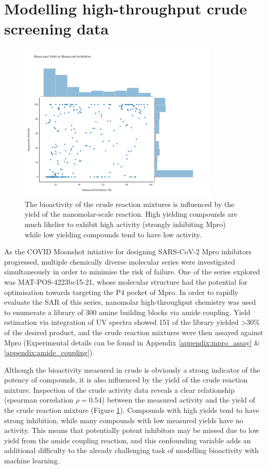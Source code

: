 \section{Modelling high-throughput crude screening data}

\begin{figure}[!t]
    \centering
    \includegraphics[width=0.85\textwidth]{Chapters/Crude/Figs/yield_vs_activity.pdf}
    \caption{The bioactivity of the crude reaction mixtures is influenced by the yield of the nanomolar-scale reaction. High yielding compounds are much likelier to exhibit high activity (strongly inhibiting Mpro) while low yielding compounds tend to have low activity.}
    \label{fig:yield_activity}
\end{figure}

As the COVID Moonshot intiative for designing SARS-CoV-2 Mpro inhibitors progressed, multiple chemically diverse molecular series were investigated simultaneously in order to minimise the risk of failure. One of the series explored was MAT-POS-4223bc15-21, whose molecular structure had the potential for optimisation towards targeting the P4 pocket of Mpro. In order to rapidly evaluate the SAR of this series, nanomolar high-throughput chemistry was used to enumerate a library of 300 amine building blocks via amide coupling. Yield estimation via integration of UV spectra showed 151 of the library yielded >30\% of the desired product, and the crude reaction mixtures were then assayed against Mpro (Experimental details can be found in Appendix \ref{appendix:mpro_assay} \& \ref{appendix:amide_coupling}).

Although the bioactivity measured in crude is obviously a strong indicator of the potency of compounds, it is also influenced by the yield of the crude reaction mixture. Inspection of the crude activity data reveals a clear relationship (spearman correlation $\rho = 0.54$) between the measured activity and the yield of the crude reaction mixture (Figure \ref{fig:yield_activity}). Compounds with high yields tend to have strong inhibition, while many compounds with low measured yields have no activity. This means that potentially potent inhibitors may be missed due to low yield from the amide coupling reaction, and this confounding variable adds an additional difficulty to the already challenging task of modelling bioactivity with machine learning. 

